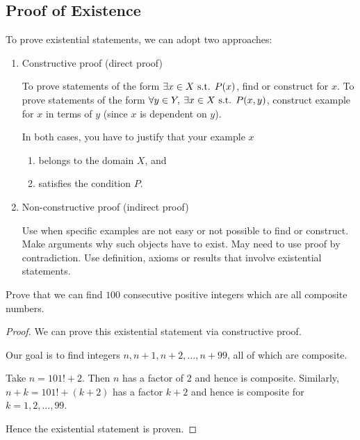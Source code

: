 \subsection{Proof of Existence}
To prove existential statements, we can adopt two approaches:
\begin{enumerate}
\item Constructive proof (direct proof)

To prove statements of the form $\exists x\in X \text{ s.t. } P(x)$, find or construct  for $x$. To prove statements of the form $\forall y\in Y,\:\exists x\in X\text{ s.t. } P(x,y)$, construct example for $x$ in terms of $y$ (since $x$ is dependent on $y$).

In both cases, you have to justify that your example $x$
\begin{enumerate}
\item belongs to the domain $X$, and
\item satisfies the condition $P$.
\end{enumerate}

\item Non-constructive proof (indirect proof)

Use when specific examples are not easy or not possible to find or construct.
Make arguments why such objects have to exist.
May need to use proof by contradiction.
Use definition, axioms or results that involve existential statements.
\end{enumerate}

\begin{exercise}
Prove that we can find $100$ consecutive positive integers which are all composite numbers.
\end{exercise}

\begin{proof}
We can prove this existential statement via constructive proof.

Our goal is to find integers $n,n+1,n+2,\dots,n+99$, all of which are composite.

Take $n=101!+2$. Then $n$ has a factor of $2$ and hence is composite. Similarly, $n+k=101!+(k+2)$ has a factor $k+2$ and hence is composite for $k=1,2,\dots,99$.

Hence the existential statement is proven.
\end{proof}

